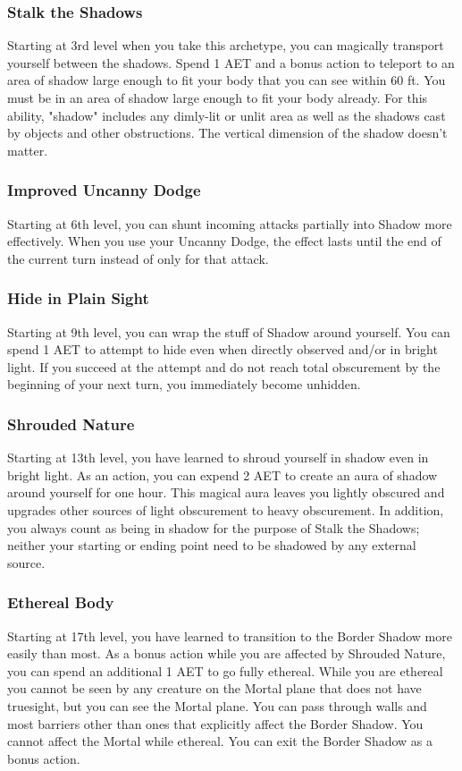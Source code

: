\subsubsection{Stalk the Shadows}
Starting at 3rd level when you take this archetype, you can magically transport yourself between the shadows. Spend 1 AET and a bonus action to teleport to an area of shadow large enough to fit your body that you can see within 60 ft. You must be in an area of shadow large enough to fit your body already. For this ability, "shadow" includes any dimly-lit or unlit area as well as the shadows cast by objects and other obstructions. The vertical dimension of the shadow doesn't matter.

\subsubsection{Improved Uncanny Dodge}
Starting at 6th level, you can shunt incoming attacks partially into Shadow more effectively. When you use your Uncanny Dodge, the effect lasts until the end of the current turn instead of only for that attack.

\subsubsection{Hide in Plain Sight}
Starting at 9th level, you can wrap the stuff of Shadow around yourself. You can spend 1 AET to attempt to hide even when directly observed and/or in bright light. If you succeed at the attempt and do not reach total obscurement by the beginning of your next turn, you immediately become unhidden.

\subsubsection{Shrouded Nature}
Starting at 13th level, you have learned to shroud yourself in shadow even in bright light. As an action, you can expend 2 AET to create an aura of shadow around yourself for one hour. This magical aura leaves you lightly obscured and upgrades other sources of light obscurement to heavy obscurement. In addition, you always count as being in shadow for the purpose of Stalk the Shadows; neither your starting or ending point need to be shadowed by any external source.  

\subsubsection{Ethereal Body}
Starting at 17th level, you have learned to transition to the Border Shadow more easily than most. As a bonus action while you are affected by Shrouded Nature, you can spend an additional 1 AET to go fully ethereal. While you are ethereal you cannot be seen by any creature on the Mortal plane that does not have truesight, but you can see the Mortal plane. You can pass through walls and most barriers other than ones that explicitly affect the Border Shadow. You cannot affect the Mortal while ethereal. You can exit the Border Shadow as a bonus action.

